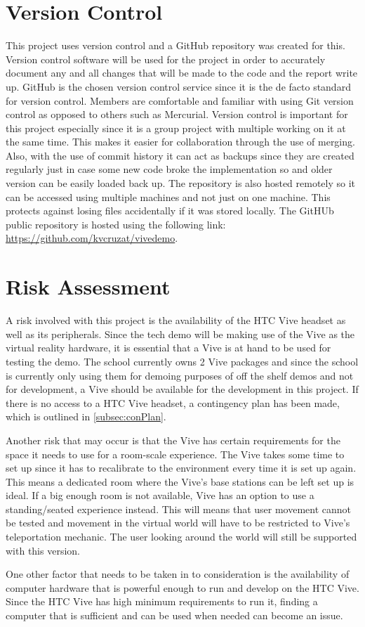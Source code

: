 \section{Version Control}
This project uses version control and a GitHub repository was created for this. Version control software will be used for the project in order to accurately document any and all changes that will be made to the code and the report write up. GitHub is the chosen version control service since it is the de facto standard for version control. Members are comfortable and familiar with using Git version control as opposed to others such as Mercurial. Version control is important for this project especially since it is a group project with multiple working on it at the same time. This makes it easier for collaboration through the use of merging. Also, with the use of commit history it can act as backups since they are created regularly just in case some new code broke the implementation so and older version can be easily loaded back up. The repository is also hosted remotely so it can be accessed using multiple machines and not just on one machine. This protects against losing files accidentally if it was stored locally. The GitHUb public repository is hosted using the following link: \url{https://github.com/kvcruzat/vivedemo}.

\section{Risk Assessment}
A risk involved with this project is the availability of the HTC Vive headset as well as its peripherals. Since the tech demo will be making use of the Vive as the virtual reality hardware, it is essential that a Vive is at hand to be used for testing the demo. The school currently owns 2 Vive packages and since the school is currently only using them for demoing purposes of off the shelf demos and not for development, a Vive should be available for the development in this project. If there is no access to a HTC Vive headset, a contingency plan has been made, which is outlined in \ref{subsec:conPlan}.
\newline
\par
Another risk that may occur is that the Vive has certain requirements for the space it needs to use for a room-scale experience. The Vive takes some time to set up since it has to recalibrate to the environment every time it is set up again. This means a dedicated room where the Vive's base stations can be left set up is ideal. If a big enough room is not available, Vive has an option to use a standing/seated experience instead. This will means that user movement cannot be tested and movement in the virtual world will have to be restricted to Vive’s teleportation mechanic. The user looking around the world will still be supported with this version.
\newline
\par
One other factor that needs to be taken in to consideration is the availability of computer hardware that is powerful enough to run and develop on the HTC Vive. Since the HTC Vive has high minimum requirements to run it, finding a computer that is sufficient and can be used when needed can become an issue.

